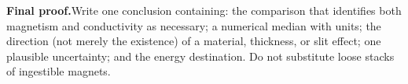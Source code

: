 {\textbf{Final proof.}\quad Write one conclusion containing: the comparison
that identifies both magnetism and conductivity as necessary; a numerical
median with units; the direction (not merely the existence) of a material,
thickness, or slit effect; one plausible uncertainty; and the energy
destination. Do not substitute loose stacks of ingestible magnets.
}

